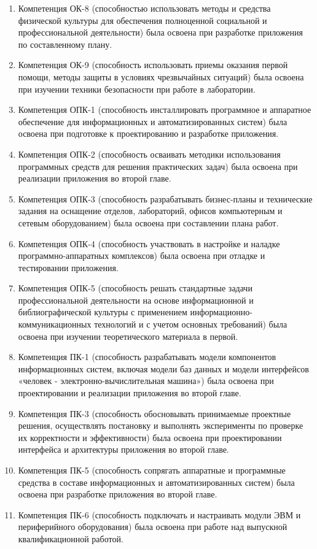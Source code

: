 \begin{enumerate}
  \item Компетенция ОК-8 (способностью использовать методы и средства физической культуры для обеспечения полноценной социальной и профессиональной деятельности) была освоена при разработке приложения по составленному плану.
  
  \item Компетенция ОК-9 (способность использовать приемы оказания первой помощи, методы защиты в условиях чрезвычайных ситуаций) была освоена при изучении техники безопасности при работе в лаборатории.
  
  \item Компетенция ОПК-1 (способность инсталлировать программное и аппаратное обеспечение для информационных и автоматизированных систем) была освоена при подготовке к проектированию и разработке приложения.
  
  \item Компетенция ОПК-2 (способность осваивать методики использования программных средств для решения практических задач) была освоена при реализации приложения во второй главе.
  
  \item Компетенция ОПК-3 (способность разрабатывать бизнес-планы и технические задания на оснащение отделов, лабораторий, офисов компьютерным и сетевым оборудованием) была освоена при составлении плана работ.
  
  \item Компетенция ОПК-4 (способность участвовать в настройке и наладке программно-аппаратных комплексов) была освоена при отладке и тестировании приложения.
  
  \item Компетенция ОПК-5 (способность решать стандартные задачи профессиональной деятельности на основе информационной и библиографической культуры с применением информационно-коммуникационных технологий и с учетом основных требований) 
была освоена при изучении теоретического материала в первой.
  
  \item Компетенция ПК-1 (способность разрабатывать модели компонентов информационных систем, включая модели баз данных и модели интерфейсов «человек - электронно-вычислительная машина») была освоена при проектировании и реализации 
приложения во второй главе.
  
  \item Компетенция ПК-3 (способность обосновывать принимаемые проектные решения, осуществлять постановку и выполнять эксперименты по проверке их корректности и эффективности) была освоена при проектировании интерфейса и архитектуры приложения во второй главе.
  
  \item  Компетенция ПК-5 (способность сопрягать аппаратные и программные средства в составе информационных и автоматизированных систем) была освоена при разработке приложения во второй главе.
  
  \item  Компетенция ПК-6 (способность подключать и настраивать модули ЭВМ и периферийного оборудования) была освоена при работе над выпускной квалификационной работой.
  
\end{enumerate}
